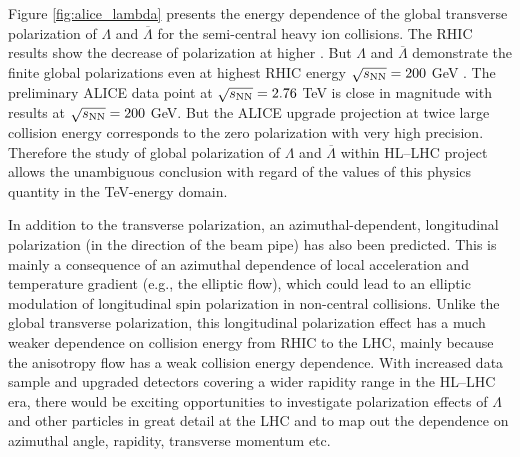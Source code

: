 Figure \ref{fig:alice_lambda} presents the energy dependence of the global transverse polarization of $\Lambda$ and $\overline{\Lambda}$ for the semi-central heavy ion collisions. The RHIC results show the decrease of polarization at higher \snn. But $\Lambda$ and $\overline{\Lambda}$ demonstrate the finite global polarizations even at highest RHIC energy $\sqrt{s_{\mathrm{NN}}}=200$ GeV \cite{PRC-98-014910-2018}. The preliminary ALICE data point at $\sqrt{s_{\mathrm{NN}}}=2.76$ TeV is close in magnitude with results at $\sqrt{s_{\mathrm{NN}}}=200$ GeV. But the ALICE upgrade projection at twice large collision energy corresponds to the zero polarization with very high precision. Therefore the study of global polarization of $\Lambda$ and $\overline{\Lambda}$ within HL--LHC project allows the unambiguous conclusion with regard of the values of this physics quantity in the TeV-energy domain.    

In addition to the transverse polarization, an azimuthal-dependent, longitudinal polarization (in the direction of the beam pipe) has also been predicted. This is mainly a consequence of an azimuthal dependence of local acceleration and temperature gradient (e.g., the elliptic flow),
which could lead to an elliptic modulation of longitudinal spin polarization in non-central collisions. Unlike the global transverse polarization,
this longitudinal polarization effect has a much weaker dependence on collision energy from RHIC to the LHC\cite{Karpenko:2017dui}, mainly because the anisotropy flow has a weak collision energy dependence. With increased data sample and upgraded detectors covering a wider rapidity range in the HL--LHC era, there would be exciting opportunities to investigate polarization effects of $\Lambda$ and other particles in great detail at the LHC and to map out the dependence on azimuthal angle, rapidity, transverse momentum etc.

